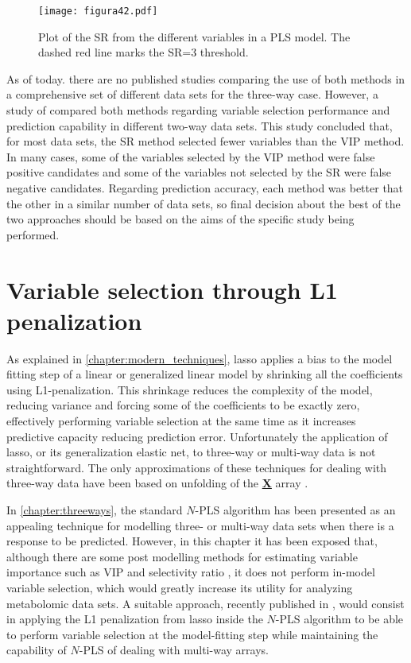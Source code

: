 \begin{figure}[hbtp]
\centering
\texttt{[image: figura42.pdf]}
\caption[Plot of the SR from the different variables in a PLS model]{Plot of the SR from the different variables in a PLS model. The dashed red line marks the SR=3 threshold.}
\label{figura42}
\end{figure}

As of today. there are no published studies comparing the use of both methods in a comprehensive set of different data sets for the three-way case. However, a study of \textcite{farres2015comparison} compared both methods regarding variable selection performance and prediction capability in different two-way data sets. This study concluded that, for most data sets, the SR method selected fewer variables than the VIP method. In many cases, some of the variables selected by the VIP method were false positive candidates and some of the variables not selected by the SR were false negative candidates. Regarding prediction accuracy, each method was better that the other in a similar number of data sets, so final decision about the best of the two approaches should be based on the aims of the specific study being performed.

\section{Variable selection through L1 penalization}
As explained in \autoref{chapter:modern_techniques}, lasso applies a bias to the model fitting step of a linear or generalized linear model by shrinking all the coefficients using L1-penalization. This shrinkage reduces the complexity of the model, reducing variance and forcing some of the coefficients to be exactly zero, effectively performing variable selection at the same time as it increases predictive capacity reducing prediction error. Unfortunately the application of lasso, or its generalization elastic net, to three-way or multi-way data is not straightforward. The only approximations of these techniques for dealing with three-way data have been based on unfolding of the \textbf{\underline{X}} array \parencite{chiu2013multiway}. 

In \autoref{chapter:threeways}, the standard $N$-PLS algorithm has been presented as an appealing technique for modelling three- or multi-way data sets when there is a response to be predicted. However, in this chapter it has been exposed that, although there are some post modelling methods for estimating variable importance such as VIP \parencite{favilla2013assessing} and selectivity ratio \parencite{rajalahti2009biomarker},  it does not perform in-model variable selection, which would greatly increase its utility for analyzing metabolomic data sets. A suitable approach, recently published in \parencite{hervas2018sparse}, would consist in applying the L1 penalization from lasso inside the $N$-PLS algorithm to be able to perform variable selection at the model-fitting step while maintaining the capability of $N$-PLS of dealing with multi-way arrays. 

